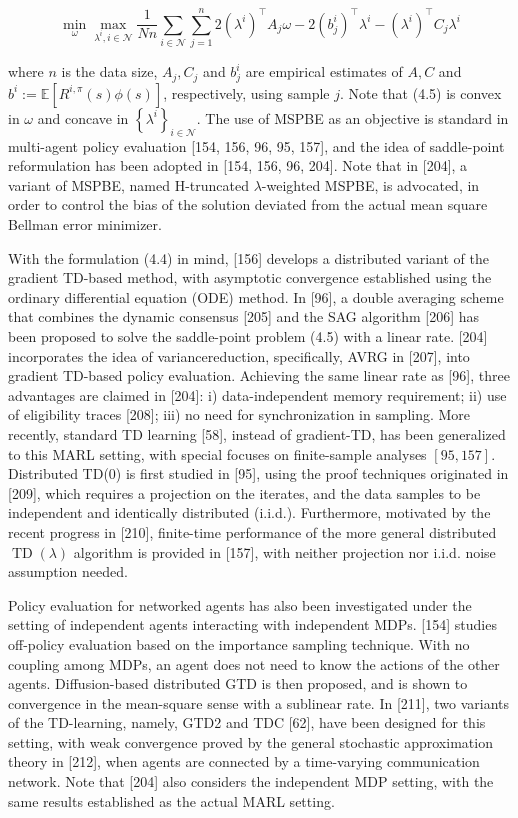 \documentclass[10pt]{article}
\begin{document}
\[
\min _{\omega} \max _{\lambda^{i}, i \in \mathcal{N}} \frac{1}{N n} \sum_{i \in \mathcal{N}} \sum_{j=1}^{n} 2\left(\lambda^{i}\right)^{\top} A_{j} \omega-2\left(b_{j}^{i}\right)^{\top} \lambda^{i}-\left(\lambda^{i}\right)^{\top} C_{j} \lambda^{i}
\]

where $n$ is the data size, $A_{j}, C_{j}$ and $b_{j}^{i}$ are empirical estimates of $A, C$ and $b^{i}:=\mathbb{E}\left[R^{i, \pi}(s) \phi(s)\right]$, respectively, using sample $j$. Note that (4.5) is convex in $\omega$ and concave in $\left\{\lambda^{i}\right\}_{i \in \mathcal{N}}$. The use of MSPBE as an objective is standard in multi-agent policy evaluation [154, 156, 96, 95, 157], and the idea of saddle-point reformulation has been adopted in [154, 156, 96, 204]. Note that in [204], a variant of MSPBE, named H-truncated $\lambda$-weighted MSPBE, is advocated, in order to control the bias of the solution deviated from the actual mean square Bellman error minimizer.

With the formulation (4.4) in mind, [156] develops a distributed variant of the gradient TD-based method, with asymptotic convergence established using the ordinary differential equation (ODE) method. In [96], a double averaging scheme that combines the dynamic consensus [205] and the SAG algorithm [206] has been proposed to solve the saddle-point problem (4.5) with a linear rate. [204] incorporates the idea of variancereduction, specifically, AVRG in [207], into gradient TD-based policy evaluation. Achieving the same linear rate as [96], three advantages are claimed in [204]: i) data-independent memory requirement; ii) use of eligibility traces [208]; iii) no need for synchronization in sampling. More recently, standard TD learning [58], instead of gradient-TD, has been generalized to this MARL setting, with special focuses on finite-sample analyses $[95,157]$. Distributed TD(0) is first studied in [95], using the proof techniques originated in [209], which requires a projection on the iterates, and the data samples to be independent and identically distributed (i.i.d.). Furthermore, motivated by the recent progress in [210], finite-time performance of the more general distributed $\operatorname{TD}(\lambda)$ algorithm is provided in [157], with neither projection nor i.i.d. noise assumption needed.

Policy evaluation for networked agents has also been investigated under the setting of independent agents interacting with independent MDPs. [154] studies off-policy evaluation based on the importance sampling technique. With no coupling among MDPs, an agent does not need to know the actions of the other agents. Diffusion-based distributed GTD is then proposed, and is shown to convergence in the mean-square sense with a sublinear rate. In [211], two variants of the TD-learning, namely, GTD2 and TDC [62], have been designed for this setting, with weak convergence proved by the general stochastic approximation theory in [212], when agents are connected by a time-varying communication network. Note that [204] also considers the independent MDP setting, with the same results established as the actual MARL setting.
\end{document}
